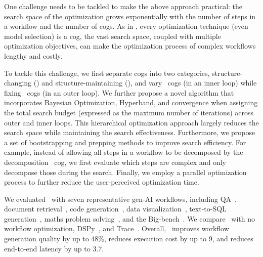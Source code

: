One challenge needs to be tackled to make the above approach practical: the search space of the optimization grows exponentially with the number of steps in a workflow and the number of cogs. As in \sysname, every optimization technique (even model selection) is a cog, the vast search space, coupled with multiple optimization objectives, can make the optimization process of complex workflows lengthy and costly.

To tackle this challenge, we first separate cogs into two categories, structure-changing ({\textit{\Outer}}) and structure-maintaining ({\textit{\Inner}}), and vary \Inner\ cogs (in an inner loop) while fixing \Outer\ cogs (in an outer loop). 
We further propose a novel algorithm that incorporates Bayesian Optimization, Hyperband, and convergence when assigning the total search budget (expressed as the maximum number of iterations) across outer and inner loops.
This hierarchical optimization approach largely reduces the search space while maintaining the search effectiveness.
Furthermore, we propose a set of bootstrapping and prepping methods to improve search efficiency.
For example, instead of allowing all steps in a workflow to be decomposed by the decomposition \Outer\ cog, we first evaluate which steps are complex and only decompose those during the search. %
Finally, we employ a parallel optimization process to further reduce the user-perceived optimization time.

We evaluated \sysname\ with seven representative gen-AI workflows, including QA~\cite{yang2018hotpotqa}, document retrieval~\cite{hover}, code generation~\cite{humaneval}, data visualization~\cite{datavis}, text-to-SQL generation~\cite{gao2023texttosql}, maths problem solving~\cite{hendrycksmath2021}, and the Big-bench~\cite{bigbench}. We compare \sysname\ with no workflow optimization, DSPy~\cite{DSPy-repo}, and Trace~\cite{Trace}.
Overall, \sysname\ improves workflow generation quality by up to 48\%, reduces execution cost by up to 9\x, and reduces end-to-end latency by up to 3.7\x. 


